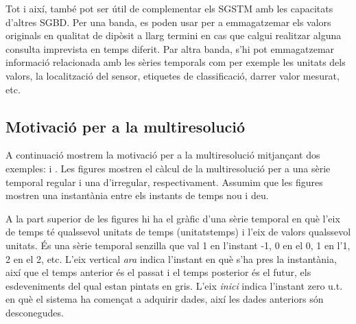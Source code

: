 Tot i així, també pot ser útil de complementar els \gls{SGSTM} amb les
capacitats d'altres \gls{SGBD}. Per una banda, es poden usar per a
emmagatzemar els valors originals en qualitat de dipòsit a llarg
termini en cas que calgui realitzar alguna consulta imprevista en
temps diferit.  Par altra banda, s'hi pot emmagatzemar
informació relacionada amb les sèries temporals com per exemple les
unitats dels valors, la localització del sensor, etiquetes de
classificació, darrer valor mesurat, etc.












\subsection{Motivació per a la multiresolució}


A continuació mostrem la motivació per a la multiresolució mitjançant
dos exemples:  i
. Les figures
mostren el càlcul de la multiresolució per a una sèrie temporal
regular i una d'irregular, respectivament.  Assumim que les figures
mostren una instantània entre els instants de temps nou i deu.


A la part superior de les figures hi ha el gràfic d'una sèrie temporal
en què l'eix de temps té qualssevol unitats de temps
(\gls{unitatstemps}) i l'eix de valors qualssevol unitats. És una
sèrie temporal senzilla que val 1 en l'instant -1, 0 en el 0, 1 en
l'1, 2 en el 2, etc.  L'eix vertical \emph{ara} indica l'instant en
què s'ha pres la instantània, així que el temps anterior és el passat
i el temps posterior és el futur, els esdeveniments del qual estan
pintats en gris. L'eix \emph{inici} indica l'instant zero u.t. en què
el sistema ha començat a adquirir dades, així les dades anteriors són
desconegudes.


